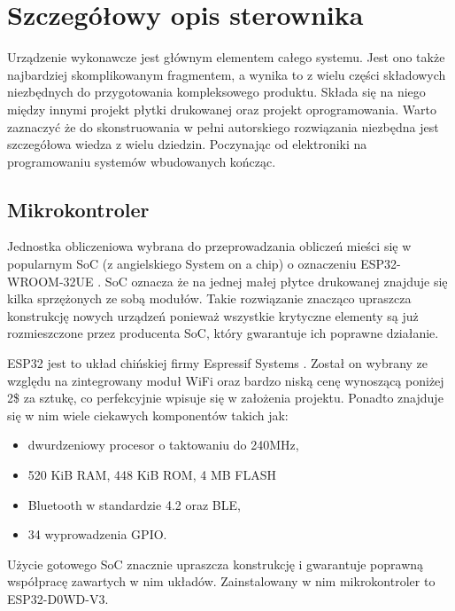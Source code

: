 
    \chapter{Szczegółowy opis sterownika}
        Urządzenie wykonawcze jest głównym elementem całego systemu. Jest ono także najbardziej skomplikowanym fragmentem, a wynika to z wielu części składowych niezbędnych do przygotowania kompleksowego produktu. Składa się na niego między innymi projekt płytki drukowanej oraz projekt oprogramowania. Warto zaznaczyć że do skonstruowania w pełni autorskiego rozwiązania niezbędna jest szczegółowa wiedza z wielu dziedzin. Poczynając od elektroniki na programowaniu systemów wbudowanych kończąc.
    
    
        \section{Mikrokontroler}
            Jednostka obliczeniowa wybrana do przeprowadzania obliczeń mieści się w popularnym SoC (z angielskiego System on a chip) o oznaczeniu ESP32-WROOM-32UE \cite{esp_module}. SoC oznacza że na jednej małej płytce drukowanej znajduje się kilka sprzężonych ze sobą modułów. Takie rozwiązanie znacząco upraszcza konstrukcję nowych urządzeń ponieważ wszystkie krytyczne elementy są już rozmieszczone przez producenta SoC, który gwarantuje ich poprawne działanie.
            
            ESP32 jest to układ chińskiej firmy Espressif Systems \cite{espressif}. Został on wybrany ze względu na zintegrowany moduł WiFi oraz bardzo niską cenę wynoszącą poniżej 2\$ za sztukę, co perfekcyjnie wpisuje się w założenia projektu. Ponadto znajduje się w nim wiele ciekawych komponentów takich jak:
    
            \begin{itemize}
              \item dwurdzeniowy procesor o taktowaniu do 240MHz,
              \item 520 KiB RAM, 448 KiB ROM, 4 MB FLASH
              \item Bluetooth w standardzie 4.2 oraz BLE,
              \item 34 wyprowadzenia GPIO.
            \end{itemize}
            
            Użycie gotowego SoC znacznie upraszcza konstrukcję i gwarantuje poprawną współpracę zawartych w nim układów. Zainstalowany w nim mikrokontroler to ESP32-D0WD-V3. 
    
